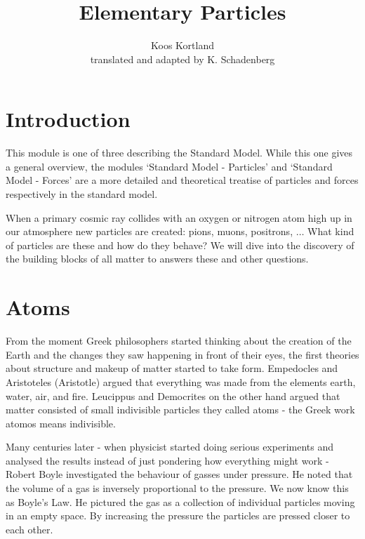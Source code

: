 


\author{Koos Kortland \\ translated and adapted by K. Schadenberg}
\date{}
\title{Elementary Particles}



\maketitle

\section{Introduction}
This module is one of three describing the Standard Model. While this one gives a  general overview, the modules `Standard Model - Particles' and `Standard Model - Forces' are a more detailed and theoretical treatise of particles and forces respectively in the standard model.

When a primary cosmic ray collides with an oxygen or nitrogen atom high up in our atmosphere new particles are created: pions, muons, positrons, $\ldots$ What kind of particles are these and how do they behave? We will dive into the discovery of the building blocks of all matter to answers these and other questions.

\section{Atoms}
From the moment Greek philosophers started thinking about the creation of the Earth and the changes they saw happening in front of their eyes, the first theories about structure and makeup of matter started to take form. Empedocles and Aristoteles (Aristotle) argued that everything was made from the elements earth, water, air, and fire. Leucippus and Democrites on the other hand argued that matter consisted of small indivisible particles they called atoms - the Greek work atomos means indivisible.

Many centuries later - when physicist started doing serious experiments and analysed the results instead of just pondering how everything might work - Robert Boyle investigated the behaviour of gasses under pressure. He noted that the volume of a gas is inversely proportional to the pressure. We now know this as Boyle's Law. He pictured the gas as a collection of individual particles moving in an empty space. By increasing the pressure the particles are pressed closer to each other.

